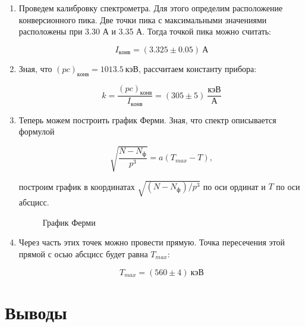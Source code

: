 \documentclass[14pt, a4paper]{report}
\begin{document}
\begin{enumerate}

\item Проведем калибровку спектрометра. Для этого определим расположение конверсионного пика. Две точки пика с максимальными значениями расположены при 3.30 А и 3.35 А. Тогда точкой пика можно считать:

\[I_{конв}=(3.325\pm0.05)\ А\]

\item Зная, что $(pc)_{конв}=1013.5\ кэВ$, рассчитаем константу прибора:

\[k=\frac{(pc)_{конв}}{I_{конв}}=(305\pm5)\ \frac{кэВ}{А}\]

\item Теперь можем построить график Ферми. Зная, что спектр описывается формулой

\[\sqrt{\frac{N-N_{ф}}{p^3}}=a(T_{max}-T),\]

построим график в координатах $\sqrt{(N-N_{ф})/p^3}$ по оси ординат и $T$ по оси абсцисс.

\begin{figure}[H]
\centering
{}
\caption{График Ферми}
\end{figure}

\item Через часть этих точек можно провести прямую. Точка пересечения этой прямой с осью абсцисс будет равна $T_{max}$:

\[T_{max}=(560\pm4)\ кэВ\]

\end{enumerate}

\section{Выводы}
\end{document}
